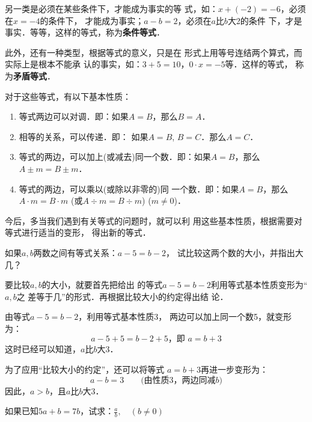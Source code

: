 另一类是必须在某些条件下，才能成为事实的等
式，如：$x+(-2)=-6$，必须在$x=-4$的条件下，
才能成为事实；$a-b=2$，必须在$a$比$b$大2的条件
下，才是事实．等等，这样的等式，称为\textbf{条件等式}．

此外，还有一种类型，根据等式的意义，只是在
形式上用等号连结两个算式，而实际上是根本不能承
认的事实，如：$3+5=10$，$0\cdot x=-5$等．这样的等式，
称为\textbf{矛盾等式}．

对于这些等式，有以下基本性质：

\begin{blk}{}
	\begin{enumerate}
		\item 等式两边可以对调．即：如果$A= B$，那么$B=A$．
		\item 相等的关系，可以传递．即：
		如果$A=B$,  $B=C$．那么$A=C$．
		\item 等式的两边，可以加上(或减去)同一个数．即：如果$A= B$，那么$A\pm m=B\pm m$．
		\item 等式的两边，可以乘以(或除以非零的)同
		一个数．即：如果$A=B$，那么$A\cdot m=B\cdot m$ (或$A\div m =
		B\div m$) ($m\ne 0$)．
	\end{enumerate}
\end{blk}


今后，多当我们遇到有关等式的问题时，就可以利
用这些基本性质，根据需要对等式进行适当的变形，
得出新的等式．

\begin{example}
	如果$a,b$两数之间有等式关系：$a-5=b-2$，
	试比较这两个数的大小，并指出大几？
\end{example}

\begin{analyze}
	要比较$a,b$的大小，就要首先把给出
	的等式$a-5=b-2$利用等式基本性质变形为“$a, b$之
	差等于几”的形式．再根据比较大小的约定得出结
	论．
\end{analyze}

\begin{solution}
	由等式$a-5=b-2$，利用等式基本性质3，
	两边可以加上同一个数5，就变形为：
	\[a-5+5=b-2+5，\text{即 } a=b+3\]
	这时已经可以知道，$a$比$b$大3．
	
	为了应用“比较大小的约定”，还可以将等式
	$a=b+3$再进一步变形为：
	\[a-b=3\qquad \text{(由性质3，两边同减$b$)}\]
	因此，$a>b$，且$a$比$b$大3．
\end{solution}

\begin{example}
	如果已知$5a + b = 7b$，试求：$\frac{a}{b},\quad (b\ne 0)$
\end{example}

